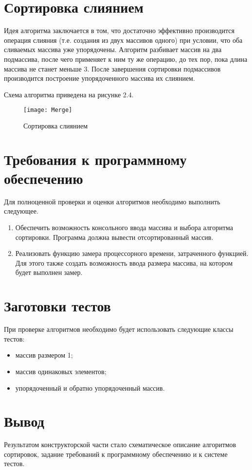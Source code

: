 \section{Сортировка слиянием}
Идея алгоритма заключается в том, что достаточно эффективно производится операция слияния (т.е. создания из двух массивов одного) при условии, что оба сливаемых массива уже упорядочены. Алгоритм разбивает массив на два подмассива, после чего применяет к ним ту же операцию, до тех пор, пока длина массива не станет меньше 3. После завершения сортировки подмассивов производится построение упорядоченного массива их слиянием.

Схема алгоритма приведена на рисунке 2.4.
\begin{figure}[h]
	\begin{center}
		{\texttt{[image: Merge]}}
		\caption{Сортировка слиянием}
	\end{center}
\end{figure}


\section{Требования к программному обеспечению}
Для полноценной проверки и оценки алгоритмов необходимо выполнить следующее.
\begin{enumerate}
	\item Обеспечить возможность консольного ввода массива и выбора алгоритма сортировки. Программа должна вывести отсортированный массив.
	\item Реализовать функцию замера процессорного времени, затраченного функцией. Для этого также создать возможность ввода размера массива, на котором будет выполнен замер.
\end{enumerate}


\section{Заготовки тестов}
При проверке алгоритмов необходимо будет использовать следующие классы тестов:
\begin{itemize}
	\item массив размером 1;
	\item массив одинаковых элементов;
	\item упорядоченный и обратно упорядоченный массив.
\end{itemize}

\section*{Вывод}
Результатом конструкторской части стало схематическое описание алгоритмов сортировок, задание требований к программному обеспечению и к системе тестов.

